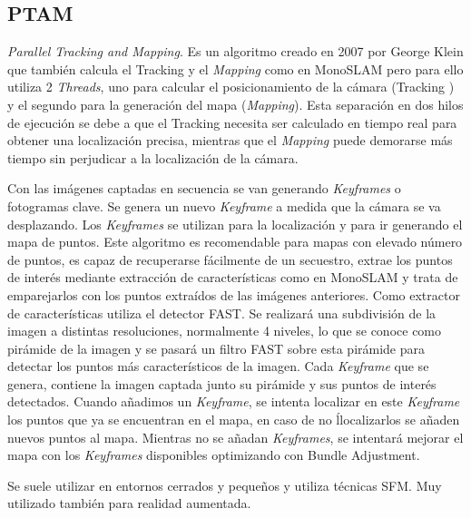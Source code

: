 \subsection{PTAM}
\textit{Parallel Tracking and \textit{Mapping}}. Es un algoritmo creado en 2007 por George Klein \cite{Klein2007parallel} que también calcula el Tracking y el \textit{Mapping} como en MonoSLAM pero para ello utiliza 2 \textit{Threads}, uno para calcular el posicionamiento de la cámara (Tracking ) y el segundo para la generación del mapa (\textit{Mapping}). Esta separación en dos hilos de ejecución se debe a que el Tracking necesita ser calculado en tiempo real para obtener una localización precisa, mientras que el \textit{Mapping} puede demorarse más tiempo sin perjudicar a la localización de la cámara. 

Con las imágenes captadas en secuencia se van generando \textit{Keyframes} o fotogramas clave. Se genera un nuevo \textit{Keyframe} a medida que la cámara se va desplazando. Los \textit{Keyframes} se utilizan para la localización y para ir generando el mapa de puntos.
Este algoritmo es recomendable para mapas con elevado número de puntos, es capaz de recuperarse fácilmente de un secuestro, extrae los puntos de interés mediante extracción de características como en MonoSLAM y trata de emparejarlos con los puntos extraídos de las imágenes anteriores.  Como extractor de características utiliza el detector FAST. Se realizará una subdivisión de la imagen a distintas resoluciones, normalmente 4 niveles, lo que se conoce como pirámide de la imagen y se pasará un filtro FAST sobre esta pirámide para detectar los puntos más característicos de la imagen.
Cada \textit{Keyframe} que se genera, contiene  la imagen captada junto su pirámide y sus puntos de interés detectados. Cuando añadimos un \textit{Keyframe}, se intenta localizar en este \textit{Keyframe} los puntos que ya se encuentran en el mapa, en caso de no ĺlocalizarlos se añaden nuevos puntos al mapa. Mientras no se añadan \textit{Keyframes}, se intentará mejorar el mapa con los \textit{Keyframes} disponibles optimizando con Bundle Adjustment.

Se suele utilizar en entornos cerrados y pequeños y utiliza técnicas SFM. Muy utilizado también para realidad aumentada.

